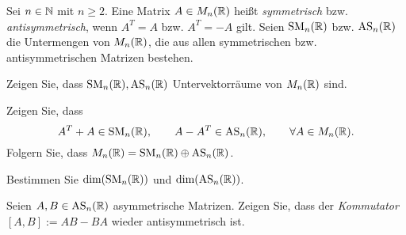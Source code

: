 \begin{Problem}
	Sei $n\in \mathbb{N}$ mit $n\ge 2$. Eine Matrix  $A\in M_n(\mathbb{R})$ heißt \emph{symmetrisch} bzw. \emph{antisymmetrisch}, wenn $A^T=A$ bzw. $A^T=-A$ gilt. Seien $\text{SM}_n(\mathbb{R})$ bzw. $\text{AS}_n(\mathbb{R})$ die Untermengen von $M_n(\mathbb{R})$, die aus allen symmetrischen bzw. antisymmetrischen Matrizen bestehen.
	\begin{parts}
	\item Zeigen Sie, dass $\text{SM}_n(\mathbb{R}), \text{AS}_n(\mathbb{R})$ Untervektorr\"{a}ume von $M_n(\mathbb{R})$ sind.
	\item Zeigen Sie, dass
		\[
			A^T+A\in \text{SM}_n(\mathbb{R}), \qquad A-A^T\in \text{AS}_n(\mathbb{R}), \qquad \forall A\in M_n(\mathbb{R})
		.\] 
		Folgern Sie, dass $M_n(\mathbb{R})=\text{SM}_n(\mathbb{R})\oplus \text{AS}_n(\mathbb{R})$.
	\item Bestimmen Sie $\text{dim}(\text{SM}_n(\mathbb{R}))$ und $\text{dim}(\text{AS}_n(\mathbb{R}))$.
	\item Seien $A,B\in \text{AS}_n(\mathbb{R})$ asymmetrische Matrizen. Zeigen Sie, dass der \emph{Kommutator} $[A,B]:=AB-BA$ wieder antisymmetrisch ist.
	\end{parts}
\end{Problem}
